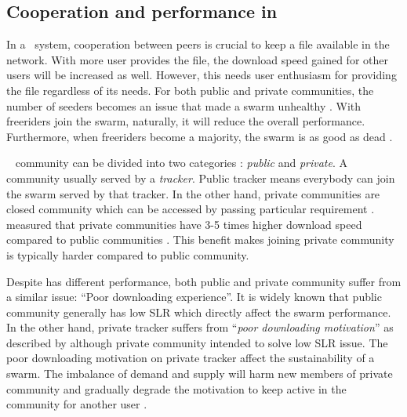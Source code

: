 
\subsection{Cooperation and performance in \bt}

In a \bt~system, cooperation between peers is crucial to keep a file available in the network. With more user provides the file, the download speed gained for other users will be increased as well. However, this needs user enthusiasm for providing the file regardless of its needs. For both public and private communities, the number of seeders becomes an issue that made a swarm unhealthy \cite{2010:pubpriv:meulpolder, 2014:sustainabilitytorrent:chen}. With freeriders join the swarm, naturally, it will reduce the overall performance. Furthermore, when freeriders become a majority, the swarm is as good as dead \cite{2000:freeridegnutella:adar}. 

\bt~ community can be divided into two categories : \textit{public} and \textit{private}. A community usually served by a \textit{tracker}. Public tracker means everybody can join the swarm served by that tracker. In the other hand, private communities are closed community which can be accessed by passing particular requirement \cite{2010:pubpriv:meulpolder, 2014:sustainabilitytorrent:chen}. \citeauthor{2010:pubpriv:meulpolder} measured that private communities have 3-5 times higher download speed compared to public communities \cite{2010:pubpriv:meulpolder}. This benefit makes joining private community is typically harder compared to public community.

Despite has different performance, both public and private community suffer from a similar issue: ``Poor downloading experience''. It is widely known that public community generally has low SLR which directly affect the swarm performance. In the other hand, private tracker suffers from ``\textit{poor downloading motivation}'' as described by \citeauthor{2014:sustainabilitytorrent:chen}\cite{2014:sustainabilitytorrent:chen} although private community intended to solve low SLR issue. The poor downloading motivation on private tracker affect the sustainability of a swarm. The imbalance of demand and supply will harm new members of private community and gradually degrade the motivation to keep active in the community for another user \cite{2014:sustainabilitytorrent:chen}.

